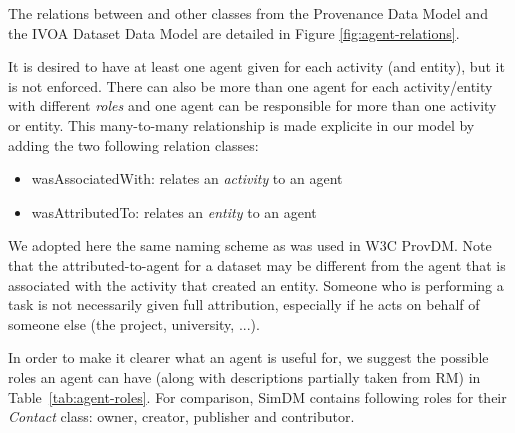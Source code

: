 The relations between  and other classes from the Provenance Data Model and
the IVOA Dataset Data Model are detailed in Figure \ref{fig:agent-relations}.

It is desired to have at least one agent given for each activity (and entity), but it
is not enforced.
There can also be more than one agent for each activity/entity with different \emph{roles} 
and one agent can be responsible for more than one activity or entity. This 
many-to-many relationship is made explicite in our model by adding the two
following relation classes:

\begin{itemize}
\item wasAssociatedWith: relates an \emph{activity} to an agent
\item wasAttributedTo: relates an \emph{entity} to an agent
\end{itemize}

We adopted here the same naming scheme as was used in W3C ProvDM.
Note that the attributed-to-agent for a dataset may be different from the 
agent that is associated with the activity that created an entity. 
Someone who is performing a task is not necessarily given full attribution, 
especially if he acts on behalf of someone else (the project, university, ...).

In order to make it clearer what an agent is useful for, we suggest the
possible roles an agent can have (along with descriptions partially taken from RM)
in Table~\ref{tab:agent-roles}. 
For comparison, SimDM contains following roles 
for their \emph{Contact} class: 
owner, creator, publisher and contributor.


